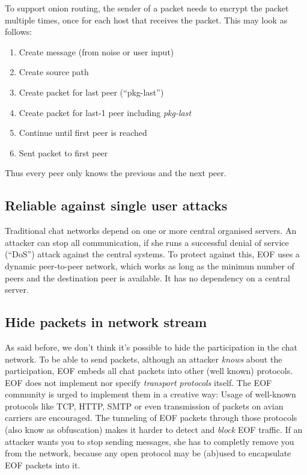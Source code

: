 \documentclass[12pt,a4paper]{book}
\begin{document}
To support onion routing, the sender of a packet needs to encrypt the packet
multiple times, once for each host that receives the packet. This may look
as follows:
\begin{enumerate}
\item Create message (from noise or user input)
\item Create source path
\item Create packet for last peer ("`pkg-last"')
\item Create packet for last-1 peer including \emph{pkg-last}
\item Continue until first peer is reached
\item Sent packet to first peer
\end{enumerate}
Thus every peer only knows the previous and the next peer.
\subsection{Reliable against single user attacks}
Traditional chat networks depend on one or more central organised servers.
An attacker can stop all communication, if she runs a successful denial
of service ("`DoS"') attack against the central systems.
To protect against this, EOF uses a dynamic peer-to-peer network, which works
as long as the minimun number of peers and the destination peer is available.
It has no dependency on a central server.
\subsection{Hide packets in network stream}
As said before, we don't think it's possible to hide the participation in the
chat network. To be able to send packets, although an attacker \emph{knows}
about the participation, EOF embeds all chat packets into other (well known)
protocols.
EOF does not implement nor specify \emph{transport protocols} itself.
The EOF community is urged to implement them in a creative way: Usage
of well-known protocols like TCP\cite{tcp-1}, HTTP\cite{http-1},
SMTP\cite{smtp-1} or even transmission of packets on avian
carriers\cite{avian-1} are encouraged. The tunneling of EOF packets through
those protocols (also know as obfuscation) makes it harder to detect
and \emph{block} EOF traffic.
If an attacker wants you to stop sending messages, she has to completly
remove you from the network, because any open protocol may be (ab)used to
encapsulate EOF packets into it.
\end{document}
